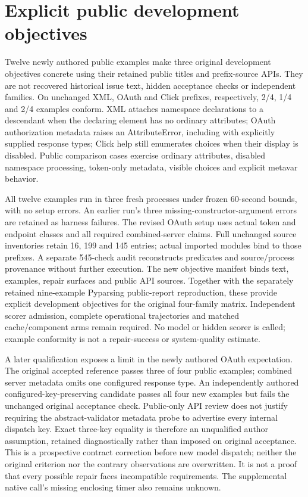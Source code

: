 \section{Explicit public development objectives}
Twelve newly authored public examples make three original development objectives
concrete using their retained public titles and prefix-source APIs. They are not
recovered historical issue text, hidden acceptance checks or independent families.
On unchanged XML, OAuth and Click prefixes, respectively, 2/4, 1/4 and 2/4
examples conform. XML attaches namespace declarations to a descendant when the
declaring element has no ordinary attributes; OAuth authorization metadata raises
an AttributeError, including with explicitly supplied response types; Click help
still enumerates choices when their display is disabled. Public comparison cases
exercise ordinary attributes, disabled namespace processing, token-only metadata,
visible choices and explicit metavar behavior.

All twelve examples run in three fresh processes under frozen 60-second bounds,
with no setup errors. An earlier run's three missing-constructor-argument errors
are retained as harness failures. The revised OAuth setup uses actual token and
endpoint classes and all required combined-server claims. Full unchanged source
inventories retain 16, 199 and 145 entries; actual imported modules bind to those
prefixes. A separate 545-check audit reconstructs predicates and source/process
provenance without further execution. The new objective manifest binds text,
examples, repair surfaces and public API sources. Together with the separately
retained nine-example Pyparsing public-report reproduction, these provide explicit
development objectives for the original four-family matrix. Independent scorer
admission, complete operational trajectories and matched cache/component arms
remain required. No model or hidden scorer is called; example conformity is not
a repair-success or system-quality estimate.

A later qualification exposes a limit in the newly authored OAuth expectation.
The original accepted reference passes three of four public examples; combined
server metadata omits one configured response type. An independently authored
configured-key-preserving candidate passes all four new examples but fails the
unchanged original acceptance check. Public-only API review does not justify
requiring the abstract-validator metadata probe to advertise every internal
dispatch key. Exact three-key equality is therefore an unqualified author
assumption, retained diagnostically rather than imposed on original acceptance.
This is a prospective contract correction before new model dispatch; neither
the original criterion nor the contrary observations are overwritten. It is not
a proof that every possible repair faces incompatible requirements. The
supplemental native call's missing enclosing timer also remains unknown.

